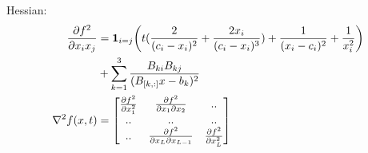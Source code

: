 \documentclass[12pt,letter]{article}
\begin{document}
\begin{enumerate}
\begin{itemize}
    Hessian:
    \begin{align*}
      \frac{\partial f^2}{\partial x_i x_j} & = \bold{1}_{i=j} \bigg( t(\frac{2}{(c_i-x_i)^2} + \frac{2x_i}{(c_i-x_i)^3}) + \frac{1}{(x_i-c_i)^2} + \frac{1}{x_i^2} \bigg)\\
                                            & + \sum_{k=1}^{3} \frac{B_{ki}B_{kj}}{(B_{[k,:]}x-b_k)^2}\\
      \nabla^2 f(x,t) & =
                        \begin{bmatrix}
                          \frac{\partial f^2}{\partial x_1^2} & \frac{\partial f^2}{\partial x_1 \partial x_2} & .. \\
                          .. & .. & .. \\
                          .. & \frac{\partial f^2}{\partial x_L \partial x_{L-1}} & \frac{\partial f^2}{\partial x_L^2}
                        \end{bmatrix}
    \end{align*}


\end{itemize}
\end{enumerate}
\end{document}
